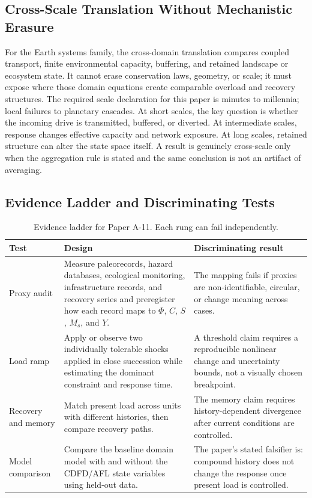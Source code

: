 \documentclass[11pt,a4paper]{article}
\begin{document}
\subsection{Cross-Scale Translation Without Mechanistic Erasure}

For the Earth systems family, the cross-domain translation compares coupled transport, finite environmental capacity, buffering, and retained landscape or ecosystem state. It cannot erase conservation laws, geometry, or scale; it must expose where those domain equations create comparable overload and recovery structures. \cite{Holling1973,Turing1952,BakTangWiesenfeld1987}
The required scale declaration for this paper is minutes to millennia; local failures to planetary cascades. At short
scales, the key question is whether the incoming drive is transmitted,
buffered, or diverted. At intermediate scales, response changes effective
capacity and network exposure. At long scales, retained structure can alter the
state space itself. A result is genuinely cross-scale only when the aggregation
rule is stated and the same conclusion is not an artifact of averaging.

\subsection{Evidence Ladder and Discriminating Tests}

\begin{table}[htbp]
\centering
\small
\caption{Evidence ladder for Paper A-11. Each rung can fail independently.}
\begin{tabularx}{\textwidth}{|p{}|X|X|}
\hline
\textbf{Test} & \textbf{Design} & \textbf{Discriminating result} \\
\hline
Proxy audit & Measure paleorecords, hazard databases, ecological monitoring, infrastructure records, and recovery series and preregister how each record maps to $\Phi$, $C$, $S$, $M_s$, and $Y$. & The mapping fails if proxies are non-identifiable, circular, or change meaning across cases. \\
\hline
Load ramp & Apply or observe two individually tolerable shocks applied in close succession while estimating the dominant constraint and response time. & A threshold claim requires a reproducible nonlinear change and uncertainty bounds, not a visually chosen breakpoint. \\
\hline
Recovery and memory & Match present load across units with different histories, then compare recovery paths. & The memory claim requires history-dependent divergence after current conditions are controlled. \\
\hline
Model comparison & Compare the baseline domain model with and without the CDFD/AFL state variables using held-out data. & The paper's stated falsifier is: compound history does not change the response once present load is controlled. \\
\hline
\end{tabularx}
\end{table}
\end{document}
